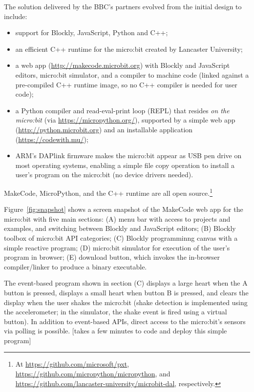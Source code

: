 The solution delivered by the BBC's partners evolved from the initial
design to include:
\begin{itemize}
\item support for Blockly, JavaScript, Python and C++;
\item an efficient C++ runtime for the micro:bit created by Lancaster
University;
\item a web app (\url{http://makecode.microbit.org})
with Blockly and JavaScript editors, micro:bit simulator, 
and a compiler to machine code (linked against a pre-compiled 
C++ runtime image, so no C++ compiler is needed for user code);
\item a Python compiler and read-eval-print loop (REPL) that resides
{\em on the micro:bit} (via \url{https://micropython.org/}), 
supported by a simple web app (\url{http://python.microbit.org}) and 
an installable application (\url{https://codewith.mu/});
\item ARM's DAPlink firmware makes the micro:bit appear as USB pen drive 
on most operating systems, enabling a simple file copy operation to 
install a user's program on the micro:bit (no device drivers needed).
\end{itemize}
MakeCode, MicroPython, and the C++ runtime are all open source.\footnote{
At \url{https://github.com/microsoft/pxt},
\url{https://github.com/micropython/micropython},
and \url{https://github.com/lancaster-university/microbit-dal}, 
respectively.}

Figure~\ref{fig:snapshot} shows a screen snapshot of the MakeCode web app
for the micro:bit with five main sections: (A) menu bar with access to projects
and examples, and switching between Blockly and JavaScript editors; (B)
Blockly toolbox of micro:bit API categories; (C) Blockly programminng
canvas with a simple reactive program; (D) micro:bit simulator for execution
of the user's program in browser; (E) download button, which invokes the in-browser
compiler/linker to produce a binary executable. 

The event-based program shown in section (C) displays a large heart when the
A button is pressed, displays a small heart when button B is pressed,
and clears the display when the user shakes the micro:bit (shake
detection is implemented using the accelerometer; in the simulator, the
shake event is fired using a virtual button). In addition to event-based
APIs, direct access to the micro:bit's sensors via polling is possible.
[takes a few minutes to code and deploy this simple program]

